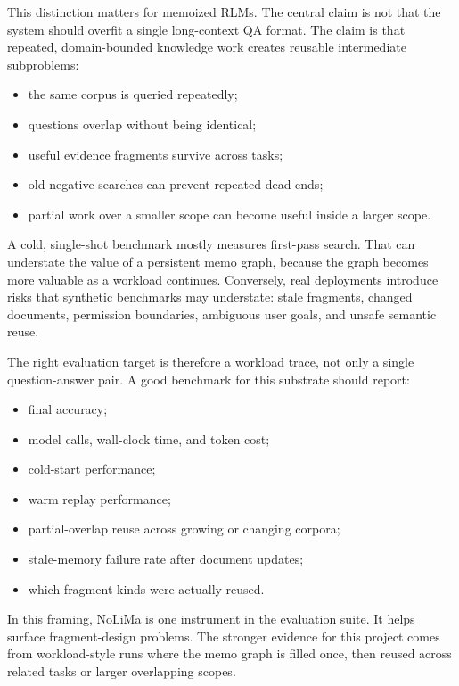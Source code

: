 \documentclass[11pt]{article}
\begin{document}
This distinction matters for memoized RLMs. The central claim is not that the
system should overfit a single long-context QA format. The claim is that
repeated, domain-bounded knowledge work creates reusable intermediate
subproblems:

\begin{itemize}[leftmargin=*]
    \item the same corpus is queried repeatedly;
    \item questions overlap without being identical;
    \item useful evidence fragments survive across tasks;
    \item old negative searches can prevent repeated dead ends;
    \item partial work over a smaller scope can become useful inside a larger
    scope.
\end{itemize}

A cold, single-shot benchmark mostly measures first-pass search. That can
understate the value of a persistent memo graph, because the graph becomes more
valuable as a workload continues. Conversely, real deployments introduce risks
that synthetic benchmarks may understate: stale fragments, changed documents,
permission boundaries, ambiguous user goals, and unsafe semantic reuse.

The right evaluation target is therefore a workload trace, not only a single
question-answer pair. A good benchmark for this substrate should report:

\begin{itemize}[leftmargin=*]
    \item final accuracy;
    \item model calls, wall-clock time, and token cost;
    \item cold-start performance;
    \item warm replay performance;
    \item partial-overlap reuse across growing or changing corpora;
    \item stale-memory failure rate after document updates;
    \item which fragment kinds were actually reused.
\end{itemize}

In this framing, NoLiMa is one instrument in the evaluation suite. It helps
surface fragment-design problems. The stronger evidence for this project comes
from workload-style runs where the memo graph is filled once, then reused across
related tasks or larger overlapping scopes.
\end{document}
